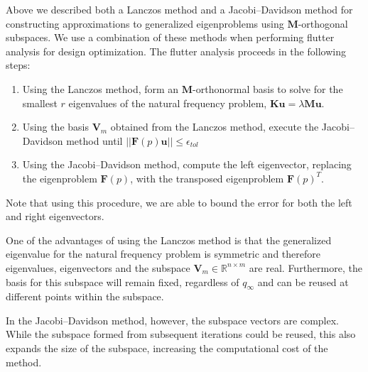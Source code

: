 \documentclass[12pt]{article}
\newcommand{\mb}{\mathbf}
\begin{document}
Above we described both a Lanczos method and a Jacobi--Davidson method
for constructing approximations to generalized eigenproblems using
$\mb{M}$-orthogonal subspaces. We use a combination of these methods
when performing flutter analysis for design optimization.  The flutter
analysis proceeds in the following steps:
%
\begin{enumerate}
\item Using the Lanczos method, form an $\mb{M}$-orthonormal basis to
  solve for the smallest $r$ eigenvalues of the natural frequency
  problem, $\mb{K} \mb{u} = \lambda \mb{M} \mb{u}$.

\item Using the basis $\mb{V}_{m}$ obtained from the Lanczos method,
  execute the Jacobi--Davidson method until $||\mb{F}(p)\mb{u}|| \le
  \epsilon_{tol}$

\item Using the Jacobi--Davidson method, compute the left eigenvector,
  replacing the eigenproblem $\mb{F}(p)$, with the transposed
  eigenproblem $\mb{F}(p)^{T}$.
\end{enumerate}

Note that using this procedure, we are able to bound the error for
both the left and right eigenvectors.

One of the advantages of using the Lanczos method is that the
generalized eigenvalue for the natural frequency problem is symmetric
and therefore eigenvalues, eigenvectors and the subspace $\mb{V}_{m}
\in \mathbb{R}^{n \times m}$ are real. Furthermore, the basis for this
subspace will remain fixed, regardless of $q_{\infty}$ and can be
reused at different points within the subspace.

In the Jacobi--Davidson method, however, the subspace vectors are
complex. While the subspace formed from subsequent iterations could be
reused, this also expands the size of the subspace, increasing the
computational cost of the method.
\end{document}
